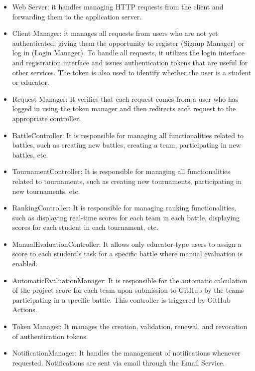 \begin{itemize}
    \item Web Server: it handles managing HTTP requests from the client and forwarding them to the application server.
    \item Client Manager: it manages all requests from users who are not yet authenticated, giving them the opportunity to register (Signup Manager) or log in (Login Manager). To handle all requests, it utilizes the login interface and registration interface and issues authentication tokens that are useful for other services. The token is also used to identify whether the user is a student or educator.
\item Request Manager: It verifies that each request comes from a user who has logged in using the token manager and then redirects each request to the appropriate controller.

\item BattleController: It is responsible for managing all functionalities related to battles, such as creating new battles, creating a team, participating in new battles, etc.

\item TournamentController: It is responsible for managing all functionalities related to tournaments, such as creating new tournaments, participating in new tournaments, etc.

\item RankingController: It is responsible for managing ranking functionalities, such as displaying real-time scores for each team in each battle, displaying scores for each student in each tournament, etc.

\item ManualEvaluationController: It allows only educator-type users to assign a score to each student's task for a specific battle where manual evaluation is enabled.

\item AutomaticEvaluationManager: It is responsible for the automatic calculation of the project score for each team upon submission to GitHub by the teams participating in a specific battle. This controller is triggered by GitHub Actions.

\item Token Manager: It manages the creation, validation, renewal, and revocation of authentication tokens.

\item NotificationManager: It handles the management of notifications whenever requested. Notifications are sent via email through the Email Service.


\end{itemize}
